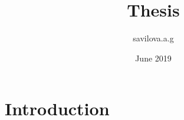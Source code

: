 \documentclass{article}
\title{Thesis}
\author{savilova.a.g }
\date{June 2019}
\begin{document}
\maketitle

\section{Introduction}
\end{document}

